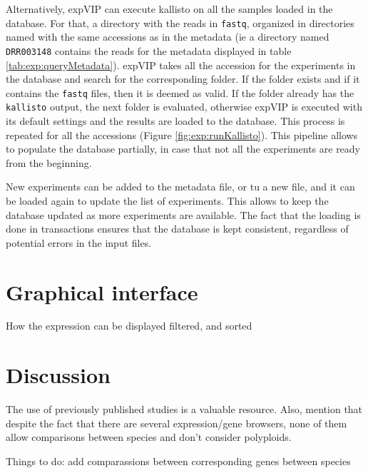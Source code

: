 Alternatively, expVIP can execute kallisto on all the samples loaded in the database. 
For that, a directory with the reads in \verb|fastq|, organized in directories named with the same accessions as in the metadata (ie a directory named \verb|DRR003148| contains the reads for the metadata displayed in table \ref{tab:exp:queryMetadata}). 
expVIP takes all the accession for the experiments in the database and search for the corresponding folder. 
If the folder exists and if it contains the \verb|fastq| files, then it is deemed as valid. 
If the folder already has the \verb|kallisto| output, the next folder is evaluated, otherwise expVIP is executed with its default settings and the results are loaded to the database. 
This process is repeated for all the accessions (Figure \ref{fig:exp:runKallisto}).  
This pipeline allows to populate the database partially, in case that not all the experiments are ready from the beginning. 

New experiments can be added to the metadata file, or tu a new file, and it can be loaded again to update the list of experiments. 
This allows to keep the database updated as more experiments are available. 
The fact that the loading is done in transactions ensures that the database is kept consistent, regardless of potential errors in the input files. 

\section{Graphical interface}
\label{exp:gui}  
How the expression can be displayed filtered, and sorted


\section{Discussion} 
The use of previously published studies is a valuable resource. Also, mention that despite the fact that there are several expression/gene browsers, none of them allow comparisons between species and don't consider polyploids. 

Things to do: add comparassions between corresponding genes between species